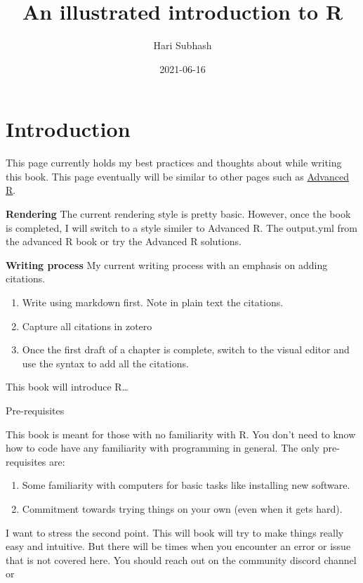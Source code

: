 \documentclass[
]{book}
\title{An illustrated introduction to R}
\author{Hari Subhash}
\date{2021-06-16}
\providecommand{\tightlist}{%
  \setlength{\itemsep}{0pt}\setlength{\parskip}{0pt}}
\begin{document}
\maketitle

{
\setcounter{tocdepth}{1}
\tableofcontents
}
\hypertarget{introduction}{%
\chapter{Introduction}\label{introduction}}

This page currently holds my best practices and thoughts about while writing this book. This page eventually will be similar to other pages such as \href{https://adv-r.hadley.nz/}{Advanced R}.

\textbf{Rendering}
The current rendering style is pretty basic. However, once the book is completed, I will switch to a style similer to Advanced R. The output.yml from the advanced R book or try the Advanced R solutions.

\textbf{Writing process}
My current writing process with an emphasis on adding citations.

\begin{enumerate}
\def\labelenumi{\arabic{enumi}.}
\tightlist
\item
  Write using markdown first. Note in plain text the citations.
\item
  Capture all citations in zotero
\item
  Once the first draft of a chapter is complete, switch to the visual editor and use the \citep{6functi} syntax to add all the citations.
\end{enumerate}

This book will introduce R\ldots{}

Pre-requisites

This book is meant for those with no familiarity with R. You don't need to know how to code have any familiarity with programming in general. The only pre-requisites are:

\begin{enumerate}
\def\labelenumi{\arabic{enumi}.}
\tightlist
\item
  Some familiarity with computers for basic tasks like installing new software.
\item
  Commitment towards trying things on your own (even when it gets hard).
\end{enumerate}

I want to stress the second point. This will book will try to make things really easy and intuitive. But there will be times when you encounter an error or issue that is not covered here. You should reach out on the community discord channel or
\end{document}
